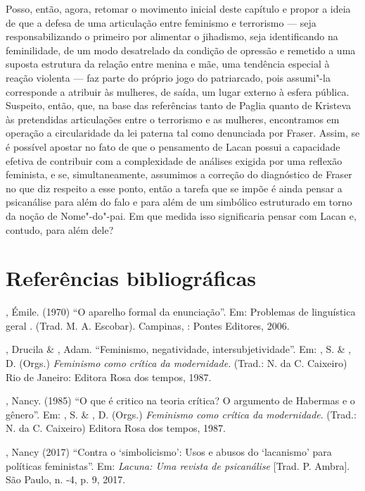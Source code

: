 Posso, então, agora, retomar o movimento inicial deste capítulo e propor
a ideia de que a defesa de uma articulação entre feminismo e terrorismo
--- seja responsabilizando o primeiro por alimentar o jihadismo, seja
identificando na feminilidade, de um modo desatrelado da condição de
opressão e remetido a uma suposta estrutura da relação entre menina e
mãe, uma tendência especial à reação violenta --- faz parte do próprio
jogo do patriarcado, pois assumi"-la corresponde a atribuir às mulheres,
de saída, um lugar externo à esfera pública. Suspeito, então, que, na
base das referências tanto de Paglia quanto de Kristeva às pretendidas
articulações entre o terrorismo e as mulheres, encontramos em operação a
circularidade da lei paterna tal como denunciada por Fraser. Assim, se é
possível apostar no fato de que o pensamento de Lacan possui a
capacidade efetiva de contribuir com a complexidade de análises exigida
por uma reflexão feminista, e se, simultaneamente, assumimos a correção
do diagnóstico de Fraser no que diz respeito a esse ponto, então a
tarefa que se impõe é ainda pensar a psicanálise para além do falo e
para além de um simbólico estruturado em torno da noção de Nome"-do"-pai.
Em que medida isso significaria pensar com Lacan e, contudo, para além
dele?

\section{Referências bibliográficas}

, Émile. (1970) ``O aparelho formal da enunciação''. Em:
Problemas de linguística geral . (Trad. M. A. Escobar). Campinas, :
Pontes Editores, 2006.

, Drucila \& , Adam. ``Feminismo, negatividade,
intersubjetividade''. Em: , S. \& , D. (Orgs.)
\emph{Feminismo como crítica da modernidade}. (Trad.: N. da C. Caixeiro)
Rio de Janeiro: Editora Rosa dos tempos, 1987.

, Nancy. (1985) ``O que é critico na teoria crítica? O argumento
de Habermas e o gênero''. Em: , S. \& , D. (Orgs.)
\emph{Feminismo como crítica da modernidade}. (Trad.: N. da C. Caixeiro)
Editora Rosa dos tempos, 1987.

, Nancy (2017) ``Contra o `simbolicismo': Usos e abusos do
`lacanismo' para políticas feministas''. Em: \emph{Lacuna: Uma revista
de psicanálise} {[}Trad. P. Ambra{]}. São Paulo, n. -4, p. 9, 2017.

